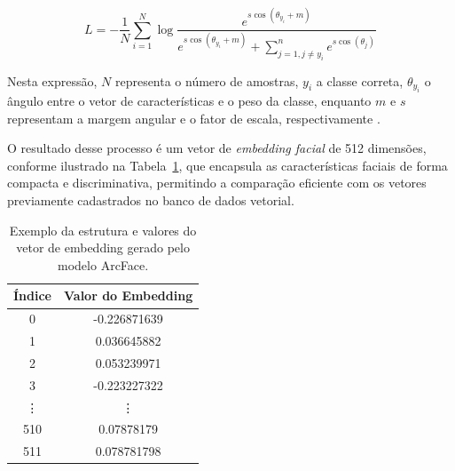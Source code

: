 \begin{equation}
\label{eq:FuncaoPerda}
L = -\frac{1}{N}\sum_{i=1}^{N} \log \frac{e^{s\cos(\theta_{y_i}+m)}}{e^{s\cos(\theta_{y_i}+m)} + \sum_{j=1, j \neq y_i}^{n} e^{s\cos(\theta_j)}}
\end{equation}

Nesta expressão, \(N\) representa o número de amostras, \(y_i\) a classe correta, \(\theta_{y_i}\) o ângulo entre o vetor de características e o peso da classe, enquanto \(m\) e \(s\) representam a margem angular e o fator de escala, respectivamente \cite{deng2019arcface}. 

O resultado desse processo é um vetor de \textit{embedding facial} de 512 dimensões, conforme ilustrado na Tabela~\ref{tab:exemplo_embedding}, que encapsula as características faciais de forma compacta e discriminativa, permitindo a comparação eficiente com os vetores previamente cadastrados no banco de dados vetorial.


\begin{table}[htbp]
    \centering
    \caption{Exemplo da estrutura e valores do vetor de embedding gerado pelo modelo ArcFace.}
    \label{tab:exemplo_embedding}
    \vspace{6pt}
    \begin{tabular}{cc}
        \hline
        \textbf{Índice} & \textbf{Valor do Embedding} \\ \hline
        0  & -0.226871639 \\
        1  &  0.036645882 \\
        2  &  0.053239971 \\
        3  & -0.223227322 \\
        \vdots & \vdots \\
        510 &  0.07878179 \\
        511 & 0.078781798 \\ \hline

    \end{tabular}
\end{table}
